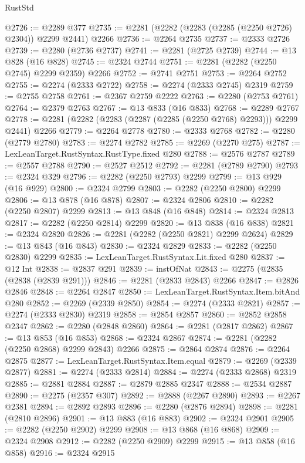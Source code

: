\begin{lexlean}{RustStd}
\begin{coremodule}
{\begin{coremodule}
{{{{{{{{{{{{{{@2726 := @2289 @377
@2735 := @2281 (@2282 (@2283 (@2285 (@2250 @2726) @2304)) @2299 @2441) @2266
@2736 := @2264 @2735
@2737 := @2333 @2726
@2739 := @2280 (@2736 @2737)
@2741 := @2281 (@2725 @2739)
@2744 := @13 @828 (@16 @828)
@2745 := @2324 @2744
@2751 := @2281 (@2282 (@2250 @2745) @2299 @2359) @2266
@2752 := @2741 @2751
@2753 := @2264 @2752
@2755 := @2274 (@2333 @2722)
@2758 := @2274 (@2333 @2745) @2319
@2759 := @2755 @2758
@2761 := @2367 @2759 @2222
@2763 := @2280 (@2753 @2761)
@2764 := @2379 @2763
@2767 := @13 @833 (@16 @833)
@2768 := @2289 @2767
@2778 := @2281 (@2282 (@2283 (@2287 (@2285 (@2250 @2768) @2293))) @2299 @2441) @2266
@2779 := @2264 @2778
@2780 := @2333 @2768
@2782 := @2280 (@2779 @2780)
@2783 := @2274 @2782
@2785 := @2269 (@2270 @275)
@2787 := LexLeanTarget.RustSyntax.RustType.fixed @280
@2788 := @2576 @2787
@2789 := @2557 @2788
@2790 := @2527 @2512
@2792 := @2281 (@2789 @2790)
@2793 := @2324 @329
@2796 := @2282 (@2250 @2793) @2299
@2799 := @13 @929 (@16 @929)
@2800 := @2324 @2799
@2803 := @2282 (@2250 @2800) @2299
@2806 := @13 @878 (@16 @878)
@2807 := @2324 @2806
@2810 := @2282 (@2250 @2807) @2299
@2813 := @13 @848 (@16 @848)
@2814 := @2324 @2813
@2817 := @2282 (@2250 @2814) @2299
@2820 := @13 @838 (@16 @838)
@2821 := @2324 @2820
@2826 := @2281 (@2282 (@2250 @2821) @2299 @2624)
@2829 := @13 @843 (@16 @843)
@2830 := @2324 @2829
@2833 := @2282 (@2250 @2830) @2299
@2835 := LexLeanTarget.RustSyntax.Lit.fixed @280
@2837 := @12 Int
@2838 := @2837 @291
@2839 := instOfNat
@2843 := @2275 (@2835 (@2838 (@2839 @291)))
@2846 := @2281 (@2833 @2843) @2266
@2847 := @2826 @2846
@2848 := @2264 @2847
@2850 := LexLeanTarget.RustSyntax.Item.bitAnd @280
@2852 := @2269 (@2339 @2850)
@2854 := @2274 (@2333 @2821)
@2857 := @2274 (@2333 @2830) @2319
@2858 := @2854 @2857
@2860 := @2852 @2858 @2347
@2862 := @2280 (@2848 @2860)
@2864 := @2281 (@2817 @2862)
@2867 := @13 @853 (@16 @853)
@2868 := @2324 @2867
@2874 := @2281 (@2282 (@2250 @2868) @2299 @2843) @2266
@2875 := @2864 @2874
@2876 := @2264 @2875
@2877 := LexLeanTarget.RustSyntax.Item.equal
@2879 := @2269 (@2339 @2877)
@2881 := @2274 (@2333 @2814)
@2884 := @2274 (@2333 @2868) @2319
@2885 := @2881 @2884
@2887 := @2879 @2885 @2347
@2888 := @2534 @2887
@2890 := @2275 (@2357 @307)
@2892 := @2888 (@2267 @2890)
@2893 := @2267 @2381
@2894 := @2892 @2893
@2896 := @2280 (@2876 @2894)
@2898 := @2281 (@2810 @2896)
@2901 := @13 @883 (@16 @883)
@2902 := @2324 @2901
@2905 := @2282 (@2250 @2902) @2299
@2908 := @13 @868 (@16 @868)
@2909 := @2324 @2908
@2912 := @2282 (@2250 @2909) @2299
@2915 := @13 @858 (@16 @858)
@2916 := @2324 @2915
}}}}}}}}}}}}}}
\end{coremodule}}
\end{coremodule}
\end{lexlean}
